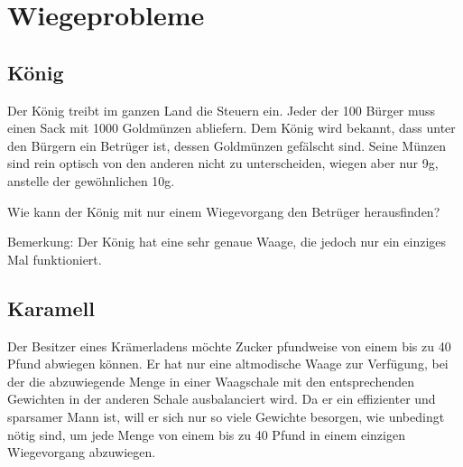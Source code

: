 
\newpage

\section{Wiegeprobleme}
\subsection{König}



Der König treibt im ganzen Land die Steuern ein. Jeder der 100 Bürger muss
einen Sack mit 1000 Goldmünzen abliefern. Dem König wird bekannt, dass unter
den Bürgern ein Betrüger ist, dessen Goldmünzen gefälscht sind. Seine Münzen
sind rein optisch von den anderen nicht zu unterscheiden, wiegen aber nur 9g,
anstelle der gewöhnlichen 10g.

Wie kann der König mit nur einem
Wiegevorgang den Betrüger herausfinden?

Bemerkung: Der König hat eine sehr
genaue Waage, die jedoch nur ein einziges Mal funktioniert.

\TNTeop{}

\subsection{Karamell}
Der Besitzer eines Krämerladens möchte Zucker pfundweise von einem bis zu
40 Pfund abwiegen können. Er hat nur eine altmodische Waage zur Verfügung,
bei der die abzuwiegende Menge in einer Waagschale mit den entsprechenden
Gewichten in der anderen Schale ausbalanciert wird. Da er ein effizienter und
sparsamer Mann ist, will er sich nur so viele Gewichte besorgen, wie unbedingt
nötig sind, um jede Menge von einem bis zu 40 Pfund in einem einzigen
Wiegevorgang abzuwiegen.


